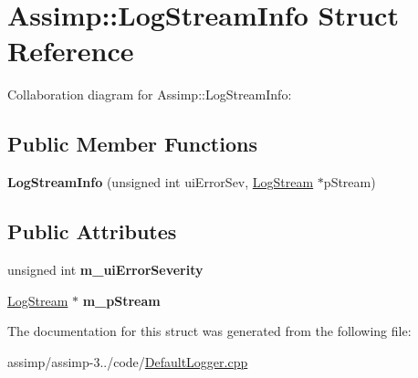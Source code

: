 \hypertarget{struct_assimp_1_1_log_stream_info}{\section{Assimp\+:\+:Log\+Stream\+Info Struct Reference}
\label{struct_assimp_1_1_log_stream_info}
}


Collaboration diagram for Assimp\+:\+:Log\+Stream\+Info\+:
\subsection*{Public Member Functions}
\begin{DoxyCompactItemize}
\item 
\hypertarget{struct_assimp_1_1_log_stream_info_ad00f64a31da7ab1d7914c7277244c890}{{\bfseries Log\+Stream\+Info} (unsigned int ui\+Error\+Sev, \hyperlink{class_assimp_1_1_log_stream}{Log\+Stream} $\ast$p\+Stream)}\label{struct_assimp_1_1_log_stream_info_ad00f64a31da7ab1d7914c7277244c890}

\end{DoxyCompactItemize}
\subsection*{Public Attributes}
\begin{DoxyCompactItemize}
\item 
\hypertarget{struct_assimp_1_1_log_stream_info_ac48bb2aab3b9e5bc03e6f77c63efc914}{unsigned int {\bfseries m\+\_\+ui\+Error\+Severity}}\label{struct_assimp_1_1_log_stream_info_ac48bb2aab3b9e5bc03e6f77c63efc914}

\item 
\hypertarget{struct_assimp_1_1_log_stream_info_a4181fbe5c8a7ddac2a6e598767ed03f1}{\hyperlink{class_assimp_1_1_log_stream}{Log\+Stream} $\ast$ {\bfseries m\+\_\+p\+Stream}}\label{struct_assimp_1_1_log_stream_info_a4181fbe5c8a7ddac2a6e598767ed03f1}

\end{DoxyCompactItemize}


The documentation for this struct was generated from the following file\+:\begin{DoxyCompactItemize}
\item 
assimp/assimp-\/3../code/\hyperlink{_default_logger_8cpp}{Default\+Logger.\+cpp}\end{DoxyCompactItemize}
